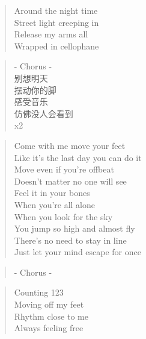 \begin{verse}
Around the night time\\
Street light creeping in\\
Release my arms all\\
Wrapped in cellophane
\end{verse}

\begin{verse}
- Chorus -\\
别想明天\\
摆动你的脚\\
感受音乐\\
仿佛没人会看到\\
x2
\end{verse}

\begin{verse}
Come with me move your feet \\
Like it's the last day you can do it\\
Move even if you're offbeat \\
Doesn't matter no one will see\\
Feel it in your bones\\
When you're all alone\\
When you look for the sky\\
You jump so high and almost fly\\
There's no need to stay in line\\
Just let your mind escape for once
\end{verse}

\begin{verse}
- Chorus -
\end{verse}

\begin{verse}
Counting 123 \\
Moving off my feet\\
Rhythm close to me\\
Always feeling free
\end{verse}

\clearpage
